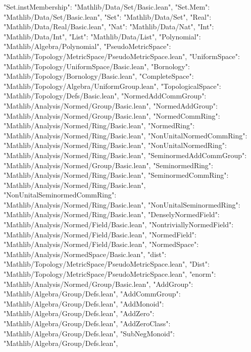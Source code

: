 \documentclass[11pt,reqno]{amsart}
\begin{document}
\begin{verbatimbox}
{	"Set.instMembership":           "Mathlib/Data/Set/Basic.lean",
	"Set.Mem":                      "Mathlib/Data/Set/Basic.lean",
	"Set":                          "Mathlib/Data/Set",
	"Real":                         "Mathlib/Data/Real/Basic.lean",
	"Nat":                          "Mathlib/Data/Nat",
	"Int":                          "Mathlib/Data/Int",
	"List":                         "Mathlib/Data/List",
	"Polynomial":                   "Mathlib/Algebra/Polynomial",
	"PseudoMetricSpace":            "Mathlib/Topology/MetricSpace/PseudoMetricSpace.lean",
	"UniformSpace":                 "Mathlib/Topology/UniformSpace/Basic.lean",
	"Bornology":                    "Mathlib/Topology/Bornology/Basic.lean",
	"CompleteSpace":                "Mathlib/Topology/Algebra/UniformGroup.lean",
	"TopologicalSpace":             "Mathlib/Topology/Defs/Basic.lean",
	"NormedAddCommGroup":           "Mathlib/Analysis/Normed/Group/Basic.lean",
	"NormedAddGroup":               "Mathlib/Analysis/Normed/Group/Basic.lean",
	"NormedCommRing":               "Mathlib/Analysis/Normed/Ring/Basic.lean",
	"NormedRing":                   "Mathlib/Analysis/Normed/Ring/Basic.lean",
	"NonUnitalNormedCommRing":      "Mathlib/Analysis/Normed/Ring/Basic.lean",
	"NonUnitalNormedRing":          "Mathlib/Analysis/Normed/Ring/Basic.lean",
	"SeminormedAddCommGroup":       "Mathlib/Analysis/Normed/Group/Basic.lean",
	"SeminormedRing":               "Mathlib/Analysis/Normed/Ring/Basic.lean",
	"SeminormedCommRing":           "Mathlib/Analysis/Normed/Ring/Basic.lean",
	"NonUnitalSeminormedCommRing":  "Mathlib/Analysis/Normed/Ring/Basic.lean",
	"NonUnitalSeminormedRing":      "Mathlib/Analysis/Normed/Ring/Basic.lean",
	"DenselyNormedField":           "Mathlib/Analysis/Normed/Field/Basic.lean",
	"NontriviallyNormedField":      "Mathlib/Analysis/Normed/Field/Basic.lean",
	"NormedField":                  "Mathlib/Analysis/Normed/Field/Basic.lean",
	"NormedSpace":                  "Mathlib/Analysis/NormedSpace/Basic.lean",
	"dist":                         "Mathlib/Topology/MetricSpace/PseudoMetricSpace.lean",
	"Dist":                         "Mathlib/Topology/MetricSpace/PseudoMetricSpace.lean",
	"enorm":                        "Mathlib/Analysis/Normed/Group/Basic.lean",
	"AddGroup":                     "Mathlib/Algebra/Group/Defs.lean",
	"AddCommGroup":                 "Mathlib/Algebra/Group/Defs.lean",
	"AddMonoid":                    "Mathlib/Algebra/Group/Defs.lean",
	"AddZero":                      "Mathlib/Algebra/Group/Defs.lean",
	"AddZeroClass":                 "Mathlib/Algebra/Group/Defs.lean",
	"SubNegMonoid":                 "Mathlib/Algebra/Group/Defs.lean",
}
\end{verbatimbox}
\end{document}
